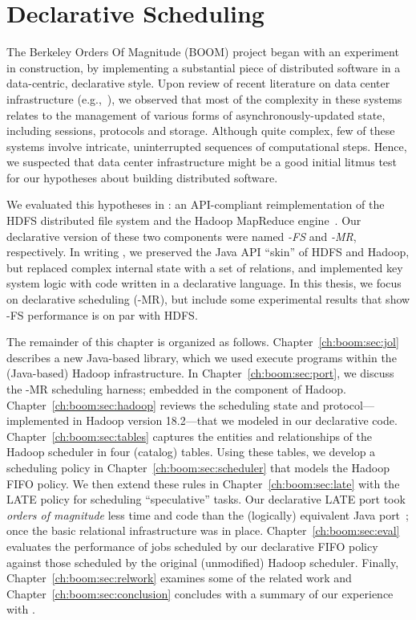 \chapter[Declarative Scheduling]{Declarative Scheduling}
\label{ch:boom}

The Berkeley Orders Of Magnitude (BOOM) project began with an experiment in
construction, by implementing a substantial piece of distributed software in a
data-centric, declarative style.  Upon review of recent literature on
data center infrastructure (e.g.,~\cite{chubby,gfs-sosp,dynamo,mapreduce-osdi}),
we observed that most of the complexity in these systems relates to the
management of various forms of asynchronously-updated state, including
sessions, protocols and storage.  Although quite complex, few of these systems
involve intricate, uninterrupted sequences of computational steps.  Hence, we
suspected that data center infrastructure might be a good initial litmus test
for our hypotheses about building distributed software.

We evaluated this hypotheses in {\em \BOOMA}: an API-compliant reimplementation
of the HDFS distributed file system and the Hadoop MapReduce
engine~\cite{boom}.  Our declarative version of these two components were named
{\em \BOOM-FS} and {\em \BOOM-MR}, respectively.  In writing \BOOMA, we
preserved the Java API ``skin'' of HDFS and Hadoop, but replaced complex
internal state with a set of relations, and implemented key system logic with
code written in a declarative language.  In this thesis, we focus on
declarative scheduling (\BOOM-MR), but include some experimental results that
show \BOOM-FS performance is on par with HDFS.

The remainder of this chapter is organized as follows.
Chapter~\ref{ch:boom:sec:jol} describes a new Java-based \OVERLOG library,
which we used execute \OVERLOG programs within the (Java-based) Hadoop
infrastructure.  In Chapter~\ref{ch:boom:sec:port}, we discuss the \BOOM-MR
scheduling harness; embedded in the \JT component of Hadoop.
Chapter~\ref{ch:boom:sec:hadoop} reviews the scheduling state and
protocol---implemented in Hadoop version 18.2---that we modeled in our
declarative code.  Chapter~\ref{ch:boom:sec:tables} captures the entities
and relationships of the Hadoop scheduler in four (catalog) tables.  Using these
tables, we develop a scheduling policy in Chapter~\ref{ch:boom:sec:scheduler}
that models the Hadoop FIFO policy.  We then extend these rules in
Chapter~\ref{ch:boom:sec:late} with the LATE policy for scheduling ``speculative''
tasks.  Our declarative LATE port took {\em orders of magnitude} less time and
code than the (logically) equivalent Java port~\cite{jira-2141}; once the basic
relational infrastructure was in place.  Chapter~\ref{ch:boom:sec:eval}
evaluates the performance of jobs scheduled by our declarative FIFO policy
against those scheduled by the original (unmodified) Hadoop scheduler.
Finally, Chapter~\ref{ch:boom:sec:relwork} examines some of the related work
and Chapter~\ref{ch:boom:sec:conclusion} concludes with a summary of our
experience with \BOOMA.

